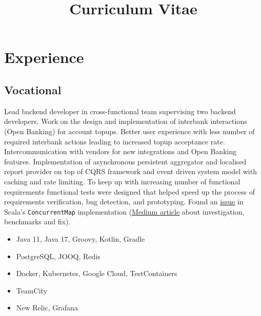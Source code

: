 \documentclass[11pt,a4paper,sans]{moderncv}
\title{Curriculum Vitae}
\begin{document}
\makecvtitle

\section{Experience}
\subsection{Vocational}
{
Lead backend developer in cross-functional team supervising two backend developers. Work on the design and implementation of interbank interactions (Open Banking) for account topups. Better user experience with less number of required interbank actions leading to increased topup acceptance rate. Intercommunication with vendors for new integrations and Open Banking features. 
\newline
\newline
Implementation of asynchronous persistent aggregator and localised report provider on top of CQRS framework and event driven system model with caching and rate limiting. To keep up with increasing number of functional requirements functional tests were designed that helped speed up the process of requirements verification, bug detection, and prototyping.
\newline
\newline
Found an \href{https://github.com/scala/bug/issues/12586}{\underline{\color{blue}issue}} in Scala's \texttt{ConcurrentMap} implementation (\href{https://medium.com/@igabaydulin/java-concurrenthashmap-vs-scala-concurrent-map-e185e8a0b798}{\underline{\color{blue}Medium article}} about investigation, benchmarks and fix).
\begin{itemize}
\item Java 11, Java 17, Groovy, Kotlin, Gradle
\item PostgreSQL, JOOQ, Redis
\item Docker, Kubernetes, Google Cloud, TestContainers
\item TeamCity
\item New Relic, Grafana
\end{itemize}
}
\end{document}
